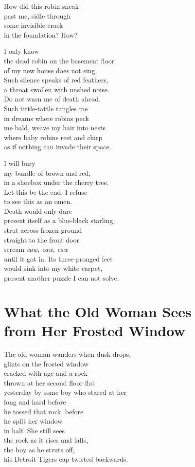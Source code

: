 \documentclass[twoside,10pt]{book}
\begin{document}
How did this robin sneak\\
past me, sidle through\\
some invisible crack\\
in the foundation? How?

I only know\\
the dead robin on the basement floor\\
of my new house does not sing.\\
Such silence speaks of red feathers,\\
a throat swollen with unshed noise.\\
Do not warn me of death ahead.\\
Such tittle-tattle tangles me\\
in dreams where robins peck\\
me bald, weave my hair into nests\\
where baby robins rest and chirp\\
as if nothing can invade their space.

I will bury\\
my bundle of brown and red,\\
in a shoebox under the cherry tree.\\
Let this be the end. I refuse\\
to see this as an omen.\\
\clearpage
Death would only dare\\
present itself as a blue-black starling,\\
strut across frozen ground\\
straight to the front door\\
scream \emph{caw, caw, caw}\\
until it got in. Its three-pronged feet\\
would sink into my white carpet,\\
present another puzzle I can not solve.


\clearpage
\section{What the Old Woman Sees\\
  from Her Frosted Window}

The old woman wanders when dusk drops,\\
glints on the frosted window\\
cracked with age and a rock\\
thrown at her second floor flat\\
yesterday by some boy who stared at her\\
long and hard before\\
he tossed that rock, before\\
he split her window\\
in half. She still sees\\
the rock as it rises and falls,\\
the boy as he struts off,\\
his Detroit Tigers cap twisted backwards.
\end{document}
